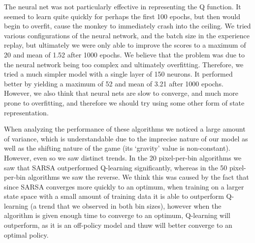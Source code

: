 \documentclass[11pt]{article}
\begin{document}
The neural net was not particularly effective in representing the Q function. It seemed to learn quite quickly for perhaps the first 100 epochs, but then would begin to overfit, cause the monkey to immediately crash into the ceiling. We tried various configurations of the neural network, and the batch size in the experience replay, but ultimately we were only able to improve the scores to a maximum of 20 and mean of 1.52 after 1000 epochs. We believe that the problem was due to the neural network being too complex and ultimately overfitting. Therefore, we tried a much simpler model with a single layer of 150 neurons. It performed better by yielding a maximum of 52 and mean of 3.21 after 1000 epochs. However, we also think that neural nets are slow to converge, and much more prone to overfitting, and therefore we should try using some other form of state representation.

When analyzing the performance of these algorithms we noticed a large amount of variance, which is understandable due to the imprecise nature of our model as well as the shifting nature of the game (its `gravity' value is non-constant). However, even so we saw distinct trends. In the 20 pixel-per-bin algorithms we saw that SARSA outperformed Q-learning significantly, whereas in the 50 pixel-per-bin algorithms we saw the reverse. We think this was caused by the fact that since SARSA converges more quickly to an optimum, when training on a larger state space with a small amount of training data it is able to outperform Q-learning (a trend that we observed in both bin sizes), however when the algorithm is given enough time to converge to an optimum, Q-learning will outperform, as it is an off-policy model and thuw will better converge to an optimal policy.
\end{document}
